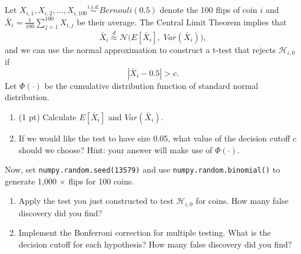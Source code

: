 \documentclass[11pt, oneside]{exam}   	%
\begin{document}
Let $X_{i,1}, X_{i,2}, ..., X_{i,100}\overset{i.i.d.}{\sim}Bernouli(0.5)$ 
denote the 100 flips of coin $i$ and $\bar{X}_i=\frac{1}{100}\sum_{j=1}^{100}X_{i,j}$ be their average.
The Central Limit Theorem implies that
\[
	\bar{X}_i \overset{d}{\approx}\mathcal{N}\bigg(E[\bar{X}_i],\; Var(\bar{X}_i)\bigg),
\]
and we can use the normal approximation to construct a t-test that rejects $\mathcal{H}_{i,0}$ if
\[
	|\bar{X}_i - 0.5| > c.
\]
Let $\Phi(\cdot)$ be the cumulative distribution function of standard normal
distribution.
\begin{enumerate}[resume*]
	\item (1 pt) Calculate $E[\bar{X}_i]$ and $Var(\bar{X}_i)$.
	      \begin{solution}

	      \end{solution}
	\item If we would like the test to have size 0.05, what value of the decision
	      cutoff $c$ should we choose?
	      Hint: your answer will make use of $\Phi(\cdot)$.
	      \begin{solution}

	      \end{solution}
\end{enumerate}
Now, set \texttt{numpy.random.seed(13579)}
and use \texttt{numpy.random.binomial()} to generate 1,000 $\times$ flips
for 100 coins.
\begin{enumerate}[resume*]
	\item Apply the test you just constructed to test $\mathcal{H}_{i,0}$ for
	      coins. How many false discovery did you find?
	      \begin{solution}

	      \end{solution}
	\item Implement the Bonferroni correction for multiple testing. 
		  What is the decision cutoff for each hypothesis?
		  How many false discovery did you find? 
	      \begin{solution}

	      \end{solution}
\end{enumerate}
\end{document}
